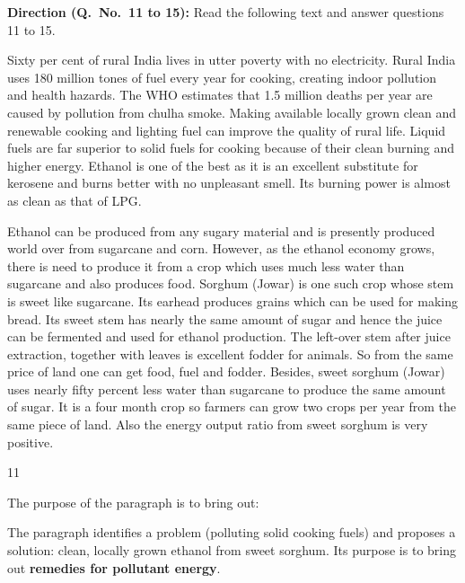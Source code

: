\begin{context}
\textbf{Direction (Q.~No.~11 to 15):} Read the following text and answer questions 11 to 15.\par\smallskip
Sixty per cent of rural India lives in utter poverty with no electricity. Rural India uses 180 million tones of fuel every year for cooking, creating indoor pollution and health hazards. The WHO estimates that 1.5 million deaths per year are caused by pollution from chulha smoke. Making available locally grown clean and renewable cooking and lighting fuel can improve the quality of rural life. Liquid fuels are far superior to solid fuels for cooking because of their clean burning and higher energy. Ethanol is one of the best as it is an excellent substitute for kerosene and burns better with no unpleasant smell. Its burning power is almost as clean as that of LPG.

Ethanol can be produced from any sugary material and is presently produced world over from sugarcane and corn. However, as the ethanol economy grows, there is need to produce it from a crop which uses much less water than sugarcane and also produces food. Sorghum (Jowar) is one such crop whose stem is sweet like sugarcane. Its earhead produces grains which can be used for making bread. Its sweet stem has nearly the same amount of sugar and hence the juice can be fermented and used for ethanol production. The left-over stem after juice extraction, together with leaves is excellent fodder for animals. So from the same price of land one can get food, fuel and fodder. Besides, sweet sorghum (Jowar) uses nearly fifty percent less water than sugarcane to produce the same amount of sugar. It is a four month crop so farmers can grow two crops per year from the same piece of land. Also the energy output ratio from sweet sorghum is very positive.
\end{context}
\begin{question}{11}
{The purpose of the paragraph is to bring out:\par}
\begin{explain}
The paragraph identifies a problem (polluting solid cooking fuels) and proposes a solution: clean, locally grown ethanol from sweet sorghum. Its purpose is to bring out \textbf{remedies for pollutant energy}.
\end{explain}
\end{question}

